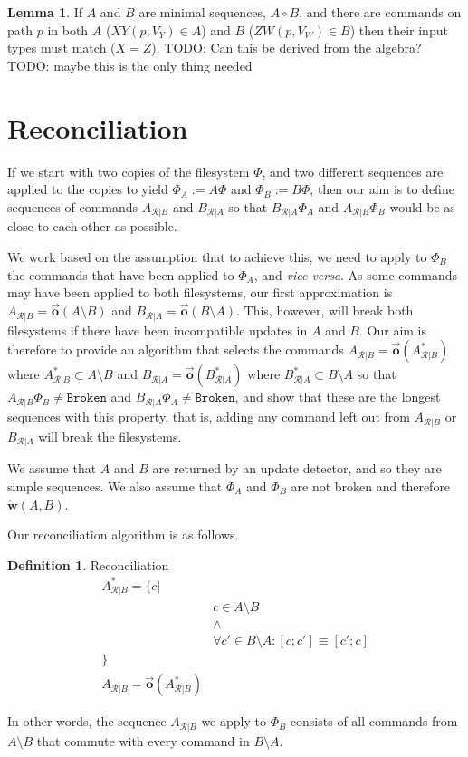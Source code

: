 \documentclass[12pt]{article}
\newcommand{\fsbroken}{\mathtt{Broken}} %
\newcommand{\FS}{\Phi} %
\newcommand{\fscommand}[2]{{#1#2}}
\newcommand{\cxy}{\fscommand{X}{Y}}
\newcommand{\czw}{\fscommand{Z}{W}}
\newcommand{\works}[1]{\dot{\mathbf{w}}({#1})}
\newcommand{\coworks}{\circ}
\newcommand{\ordered}[1]{\vec{\mathbf{o}}({#1})}
\newcommand{\recchar}[3]{{#1}^{#3}_{\mathcal{R}|{#2}}}
\newcommand{\reca}{\recchar{A}{B}{}} %
\newcommand{\recb}{\recchar{B}{A}{}}
\newcommand{\recaset}{\recchar{A}{B}{*}}
\newcommand{\recbset}{\recchar{B}{A}{*}}
\theoremstyle{definition}
\newtheorem{mydef}{Definition}
\newtheorem{mylem}{Lemma}
\begin{document}
\begin{mylem}\label{lemma:cowinputmatch}
If $A$ and $B$ are minimal sequences, $A\coworks B$,
and there are commands on path $p$ in both $A$ ($\cxy(p, V_Y)\in A$) and $B$ ($\czw(p, V_W)\in B$)
then their input types must match ($X=Z$).
TODO: Can this be derived from the algebra?
TODO: maybe this is the only thing needed
\end{mylem}

\section{Reconciliation}

If we start with two copies of the filesystem $\FS$,
and two different sequences are applied to the copies to yield $\FS_A:=A\FS$
and $\FS_B:=B\FS$, then our aim is to define sequences of commands $\reca$ and $\recb$
so that $\recb\FS_A$ and $\reca\FS_B$ would be as close to each other as possible.

We work based on the assumption that to achieve this, we need
to apply to $\FS_B$ the commands that have been applied to $\FS_A$, and \emph{vice versa}.
As some commands may have been applied to both filesystems, our first approximation
is $\reca = \ordered{A\setminus B}$ and $\recb = \ordered{B\setminus A}$.
This, however, will break both filesystems if there have been incompatible updates
in $A$ and $B$. 
Our aim is therefore to provide an algorithm that selects the commands 
$\reca = \ordered{\recaset}$  where $\recaset \subset A\setminus B$
and $\recb = \ordered{\recbset}$ where $\recbset \subset B\setminus A$ 
so that $\reca\FS_B\neq\fsbroken$ and $\recb\FS_A\neq\fsbroken$,
and show that these are the longest sequences with this property, that is,
adding any command left out from $\reca$ or $\recb$ will break the filesystems.

We assume that $A$ and $B$ are returned by an update detector,
and so they are simple sequences.
We also assume that $\FS_A$ and $\FS_B$ are not broken and therefore $\works{A,B}$.

Our reconciliation algorithm is as follows.

\begin{mydef}{Reconciliation}\label{def:reconciliation}
\begin{align*}
\recaset = \{c| & \\
& c\in A\setminus B \\
& \wedge \\
& \forall c'\in B\setminus A: [c;c']\equiv[c';c]\\
\} & \\
\reca = \ordered{\recaset}&
\end{align*}

In other words, the sequence $\reca$ we apply to $\FS_B$ consists of all commands from $A\setminus B$
that commute with every command in $B\setminus A$.
\end{mydef}
\end{document}
